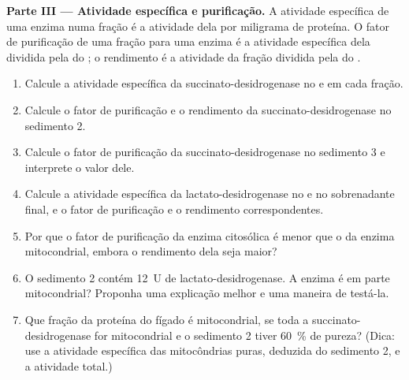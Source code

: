 \begin{problem}
\medskip
\noindent\textbf{Parte III --- Atividade específica e purificação.}
A atividade específica de uma enzima numa fração é a atividade dela por
miligrama de proteína. O fator de purificação de uma fração para uma
enzima é a atividade específica dela dividida pela do ; o
rendimento é a atividade da fração dividida pela do .
\begin{enumerate}[resume]
  \item Calcule a atividade específica da succinato-desidrogenase no
         e em cada fração.
  \item Calcule o fator de purificação e o rendimento da
        succinato-desidrogenase no sedimento 2.
  \item Calcule o fator de purificação da succinato-desidrogenase no
        sedimento 3 e interprete o valor dele.
  \item Calcule a atividade específica da lactato-desidrogenase no
         e no sobrenadante final, e o fator de purificação
        e o rendimento correspondentes.
  \item Por que o fator de purificação da enzima citosólica é menor que
        o da enzima mitocondrial, embora o rendimento dela seja maior?
  \item O sedimento 2 contém \qty{12}{U} de lactato-desidrogenase. A
        enzima é em parte mitocondrial? Proponha uma explicação melhor e
        uma maneira de testá-la.
  \item Que fração da proteína do fígado é mitocondrial, se toda a
        succinato-desidrogenase for mitocondrial e o sedimento 2 tiver
        \qty{60}{\%} de pureza? (Dica: use a atividade específica das
        mitocôndrias puras, deduzida do sedimento 2, e a atividade
        total.)
\end{enumerate}


\end{problem}
